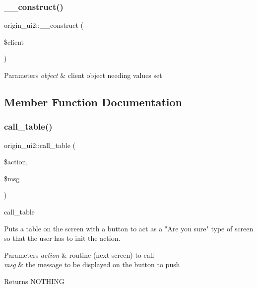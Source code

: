 \subsubsection{\texorpdfstring{\+\_\+\+\_\+construct()}{\_\_construct()}}
{\footnotesize\ttfamily origin\+\_\+ui2\+::\+\_\+\+\_\+construct (\begin{DoxyParamCaption}\item[{}]{\$client }\end{DoxyParamCaption})}


\begin{DoxyParams}{Parameters}
{\em object} & client object needing values set \\
\hline
\end{DoxyParams}


\subsection{Member Function Documentation}
\hypertarget{classorigin__ui2_a5bd82705d8ecde76f63e77920b8f8e89}{}\label{classorigin__ui2_a5bd82705d8ecde76f63e77920b8f8e89} 
\subsubsection{\texorpdfstring{call\+\_\+table()}{call\_table()}}
{\footnotesize\ttfamily origin\+\_\+ui2\+::call\+\_\+table (\begin{DoxyParamCaption}\item[{}]{\$action,  }\item[{}]{\$msg }\end{DoxyParamCaption})}

call\+\_\+table \begin{DoxyVerb}Puts a table on the screen with a button
to act as a "Are you sure" type of screen
so that the user has to init the action.
\end{DoxyVerb}



\begin{DoxyParams}{Parameters}
{\em action} & routine (next screen) to call \\
\hline
{\em msg} & the message to be displayed on the button to push \\
\hline
\end{DoxyParams}
\begin{DoxyReturn}{Returns}
N\+O\+T\+H\+I\+NG 
\end{DoxyReturn}
\hypertarget{classorigin__ui2_ac79b126fb01d3f54d2507c860564655d}{}\label{classorigin__ui2_ac79b126fb01d3f54d2507c860564655d} 
